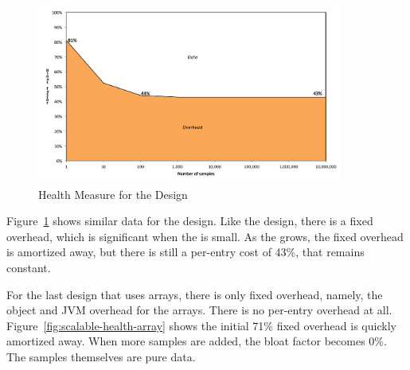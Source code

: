 
\begin{figure}
  \centering
   \includegraphics[width=0.9\textwidth]{part1/Figures/memoryhealth/scalable-health-arraylist}
  \caption{Health Measure for the  Design }
  \label{fig:scalable-health-arraylist}
\end{figure}

Figure~\ref{fig:scalable-health-arraylist} shows similar data for the
 design. Like the  design, there is a fixed
overhead, which is significant when the  is small. As the
 grows, the fixed overhead is amortized away, but there is still
a per-entry cost of 43\%, that remains constant.

For the last design that uses arrays, there is only fixed overhead, namely, the
 object and JVM overhead for the arrays. There is no per-entry
overhead at all. Figure~\ref{fig:scalable-health-array} shows the initial 71\%
fixed overhead is quickly amortized away. When more samples are added, the bloat
factor becomes 0\%. The samples themselves are pure data.

